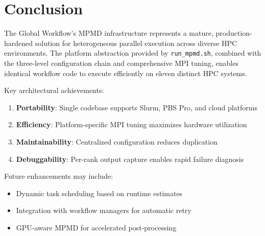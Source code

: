 \documentclass[11pt,a4paper,twoside]{article}
\begin{document}
\section{Conclusion}
\label{sec:conclusion}

The Global Workflow's MPMD infrastructure represents a mature, production-hardened solution for heterogeneous parallel execution across diverse HPC environments. The platform abstraction provided by \texttt{run\_mpmd.sh}, combined with the three-level configuration chain and comprehensive MPI tuning, enables identical workflow code to execute efficiently on eleven distinct HPC systems.

Key architectural achievements:

\begin{enumerate}
    \item \textbf{Portability}: Single codebase supports Slurm, PBS Pro, and cloud platforms
    \item \textbf{Efficiency}: Platform-specific MPI tuning maximizes hardware utilization
    \item \textbf{Maintainability}: Centralized configuration reduces duplication
    \item \textbf{Debuggability}: Per-rank output capture enables rapid failure diagnosis
\end{enumerate}

Future enhancements may include:

\begin{itemize}
    \item Dynamic task scheduling based on runtime estimates
    \item Integration with workflow managers for automatic retry
    \item GPU-aware MPMD for accelerated post-processing
\end{itemize}
\end{document}
